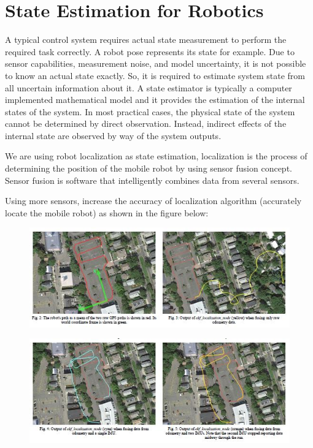 \section{State Estimation for Robotics} \label{stateEstimator}

\hspace{2cm}A typical control system requires actual state measurement to perform the required task correctly. A robot pose represents its state for example. Due to sensor capabilities, measurement noise, and model uncertainty, it is not possible to know an actual state exactly. So, it is required to estimate system state from all uncertain  information about it. A state estimator is typically a computer implemented mathematical model and it provides the estimation of the internal states of the system. In most practical cases, the physical state of the system cannot be determined by direct observation. Instead, indirect effects of the internal state are observed by way of the system outputs.\cite{stateEstimator}
\par
We are using robot localization as state estimation, localization is the process of determining the position of the mobile robot by using sensor fusion concept. Sensor fusion is software that intelligently combines data from several sensors.\cite{web034}
\par
Using more sensors, increase the accuracy of localization algorithm (accurately locate the mobile robot) as shown in the figure below:


 \begin{figure}[H]%
    \center%
    \includegraphics[width=.9\textwidth]{images/Alaa/sensorFusion0.JPG}%
  \end{figure}
  
 \begin{figure}[H]%
    \center%
    \includegraphics[width=.9\textwidth]{images/Alaa/sensorFusion1.JPG}%
  \end{figure}
  
